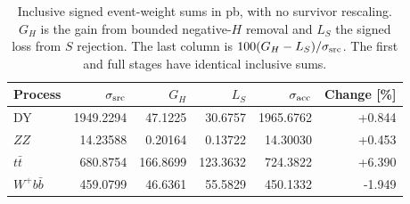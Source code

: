 \begin{table}[t]
\centering\small
\setlength{\tabcolsep}{5pt}
\begin{tabular}{lrrrrr}
\toprule
Process & $\sigma_{\rm src}$ & $G_H$ & $L_S$ & $\sigma_{\rm acc}$ & Change [\%]\\
\midrule
DY & 1949.2294 & 47.1225 & 30.6757 & 1965.6762 & +0.844\\
$ZZ$ & 14.23588 & 0.20164 & 0.13722 & 14.30030 & +0.453\\
$t\bar t$ & 680.8754 & 166.8699 & 123.3632 & 724.3822 & +6.390\\
$W^+b\bar b$ & 459.0799 & 46.6361 & 55.5829 & 450.1332 & -1.949\\
\bottomrule
\end{tabular}
\caption{Inclusive signed event-weight sums in pb, with no survivor rescaling. $G_H$ is the gain from bounded negative-$H$ removal and $L_S$ the signed loss from $S$ rejection. The last column is $100(G_H-L_S)/\sigma_{\rm src}$. The first and full stages have identical inclusive sums.}
\label{tab:rates}
\end{table}
